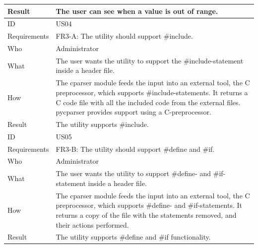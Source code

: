 \begin{table}[htbp]
{\begin{tabularx}{1.2\textwidth}{l X}
	Result & The user can see when a value is out of range. \\
	\midrule
	ID & US04 \\
	Requirements & FR3-A: The utility should support \#include.\\
	Who & Administrator \\
	What & The user wants the utility to support the \#include-statement inside a header file.\\
	How & The cparser module feeds the input into an external tool, the C preprocessor, which supports 
		\#include-statements. It returns a C code file with all the included code from the external files. pycparser
		provides support using a C-preprocessor.  \\
	Result & The utility supports \#include. \\
	\midrule
	ID & US05 \\
	Requirements & FR3-B: The utility should support \#define and \#if. \\
	Who & Administrator \\
	What & The user wants the utility to support \#define- and \#if-statement inside a header file.\\
	How & The cparser module feeds the input into an external tool, the C preprocessor, which supports 
		\#define- and \#if-statements. It returns a copy of the file with the statements removed, and their actions performed. \\
	Result & The utility supports \#define and \#if functionality. \\
	\bottomrule
\end{tabularx}}
\end{table}


